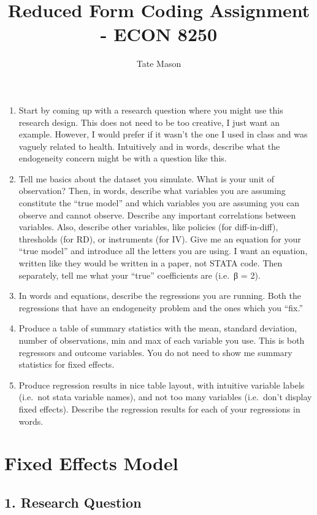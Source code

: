 \documentclass[
  letterpaper,
  DIV=11,
  numbers=noendperiod]{scrartcl}
\title{Reduced Form Coding Assignment - ECON 8250}
\author{Tate Mason}
\date{}
\providecommand{\tightlist}{%
  \setlength{\itemsep}{0pt}\setlength{\parskip}{0pt}}
\begin{document}
\maketitle


\begin{enumerate}
\def\labelenumi{\arabic{enumi}.}
\tightlist
\item
  Start by coming up with a research question where you might use this
  research design. This does not need to be too creative, I just want an
  example. However, I would prefer if it wasn't the one I used in class
  and was vaguely related to health. Intuitively and in words, describe
  what the endogeneity concern might be with a question like this.
\item
  Tell me basics about the dataset you simulate. What is your unit of
  observation? Then, in words, describe what variables you are assuming
  constitute the ``true model'' and which variables you are assuming you
  can observe and cannot observe. Describe any important correlations
  between variables. Also, describe other variables, like policies (for
  diff-in-diff), thresholds (for RD), or instruments (for IV). Give me
  an equation for your ``true model'' and introduce all the letters you
  are using. I want an equation, written like they would be written in a
  paper, not STATA code. Then separately, tell me what your ``true''
  coefficients are (i.e.~β = 2).
\item
  In words and equations, describe the regressions you are running. Both
  the regressions that have an endogeneity problem and the ones which
  you ``fix.''
\item
  Produce a table of summary statistics with the mean, standard
  deviation, number of observations, min and max of each variable you
  use. This is both regressors and outcome variables. You do not need to
  show me summary statistics for fixed effects.
\item
  Produce regression results in nice table layout, with intuitive
  variable labels (i.e.~not stata variable names), and not too many
  variables (i.e.~don't display fixed effects). Describe the regression
  results for each of your regressions in words.
\end{enumerate}

\section{Fixed Effects Model}\label{fixed-effects-model}

\subsection{1. Research Question}\label{research-question}
\end{document}
